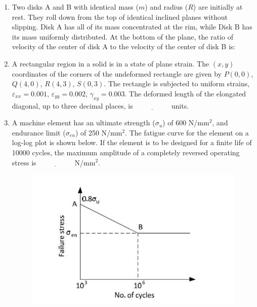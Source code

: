 \documentclass[journal]{IEEEtran}
\begin{document}
\begin{enumerate}[leftmargin=0pt]
    \item Two disks A and B with identical mass ($m$) and radius ($R$) are initially at rest. They roll down from the top of identical inclined planes without slipping. Disk A has all of its mass concentrated at the rim, while Disk B has its mass uniformly distributed. At the bottom of the plane, the ratio of velocity of the center of disk A to the velocity of the center of disk B is:
    \begin{enumerate}
    \end{enumerate}

    \item A rectangular region in a solid is in a state of plane strain. The $(x,y)$ coordinates of the corners of the undeformed rectangle are given by $P(0,0)$, $Q(4,0)$, $R(4,3)$, $S(0,3)$. The rectangle is subjected to uniform strains, $\varepsilon_{xx} = 0.001$, $\varepsilon_{yy} = 0.002$, $\gamma_{xy} = 0.003$. The deformed length of the elongated diagonal, up to three decimal places, is $\underline{\hspace{2cm}}$ units.

    \item A machine element has an ultimate strength ($\sigma_u$) of 600 N/mm$^2$, and endurance limit ($\sigma_{en}$) of 250 N/mm$^2$. The fatigue curve for the element on a log-log plot is shown below. If the element is to be designed for a finite life of 10000 cycles, the maximum amplitude of a completely reversed operating stress is $\underline{\hspace{2cm}}$ N/mm$^2$.
    \begin{figure}[h]
    \centering
    \includegraphics[width=0.5\columnwidth]{Figs/image (27).png}
    \caption*{}
    \label{fig:43}
    \end{figure}


\end{enumerate}
\end{document}
